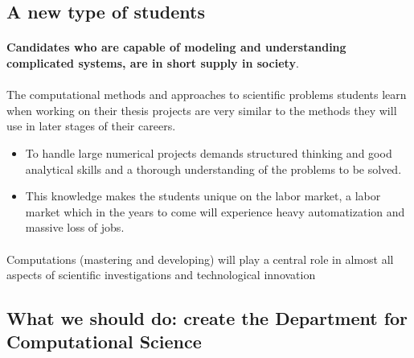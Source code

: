 \documentclass[%
oneside,                 %
final,                   %
10pt]{article}
\begin{document}
\subsection{A new type of students}

\paragraph{}
\textbf{Candidates who are capable of modeling and understanding complicated
systems, are in short supply in society}.



\paragraph{}
The computational methods and approaches to scientific problems students learn
when working on their thesis projects are very similar to the methods
they will use in later stages of their careers.  
\begin{itemize}
\item To handle large numerical projects demands structured thinking and good analytical skills and a thorough understanding of the problems to be solved. 

\item This knowledge makes the students unique on the labor market, a labor market which in the years to come will experience heavy automatization and massive loss of jobs.
\end{itemize}

\noindent




\paragraph{}
Computations (mastering and developing)  will play a central role in almost all aspects of scientific investigations and technological innovation





\subsection{What we should do: create the Department  for Computational Science}
\end{document}
